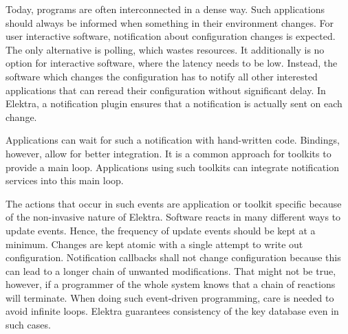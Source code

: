 Today, programs are often interconnected in a dense way. Such applications should always be informed when something in their environment changes. For user interactive software, notification about configuration changes is expected. The only alternative is polling, which wastes resources. It additionally is no option for interactive software, where the latency needs to be low. Instead, the software which changes the configuration has to notify all other interested applications that can reread their configuration without significant delay. In Elektra, a notification plugin ensures that a notification is actually sent on each change.

Applications can wait for such a notification with hand-\/written code. Bindings, however, allow for better integration. It is a common approach for toolkits to provide a main loop. Applications using such toolkits can integrate notification services into this main loop.

The actions that occur in such events are application or toolkit specific because of the non-\/invasive nature of Elektra. Software reacts in many different ways to update events. Hence, the frequency of update events should be kept at a minimum. Changes are kept atomic with a single attempt to write out configuration. Notification callbacks shall not change configuration because this can lead to a longer chain of unwanted modifications. That might not be true, however, if a programmer of the whole system knows that a chain of reactions will terminate. When doing such event-\/driven programming, care is needed to avoid infinite loops. Elektra guarantees consistency of the key database even in such cases. 